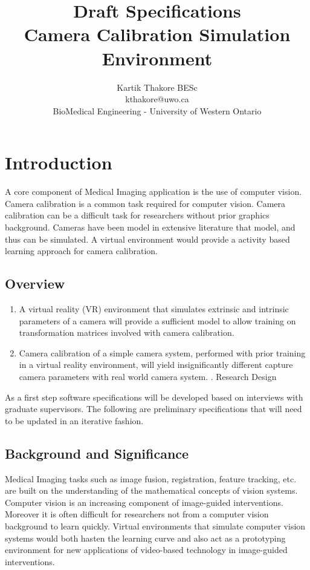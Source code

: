 \documentclass[11pt]{report}
\title{Draft Specifications\\Camera Calibration Simulation Environment}
\author{Kartik Thakore BESc\\
		kthakore@uwo.ca\\
		BioMedical Engineering - University of Western Ontario}
\date{}
\begin{document}

\nocite{*}

\maketitle

\chapter{Introduction}
  
A core component of Medical Imaging application is the use of computer vision. Camera calibration is a common task required for computer vision. Camera calibration can be a difficult task for researchers without prior graphics background. Cameras have been model in extensive literature that model, and thus can be simulated. A virtual environment would provide a activity based learning approach for camera calibration. 
     
\section{Overview}


     
\begin{enumerate}
\item A virtual reality (\gls{VR}) environment that simulates extrinsic and intrinsic parameters of a camera will provide a sufficient model to allow training on transformation matrices involved with camera calibration.
\item Camera calibration of a simple camera system, performed with prior training in a virtual reality environment, will yield insignificantly different capture camera parameters with real world camera system. 
. Research Design
\end{enumerate}

As a first step software specifications will be developed based on interviews with graduate supervisors. The following are preliminary specifications that will need to be updated in an iterative fashion. 

\section{Background and Significance}

Medical Imaging tasks such as image fusion, registration, feature tracking, etc. are built on the understanding of the mathematical concepts of vision systems. Computer vision is an increasing component of image-guided interventions. Moreover it is often difficult for researchers not from a computer vision background to learn quickly. Virtual environments that simulate computer vision systems would both hasten the learning curve and also act as a prototyping environment for new applications of video-based technology in image-guided interventions. 
\end{document}
